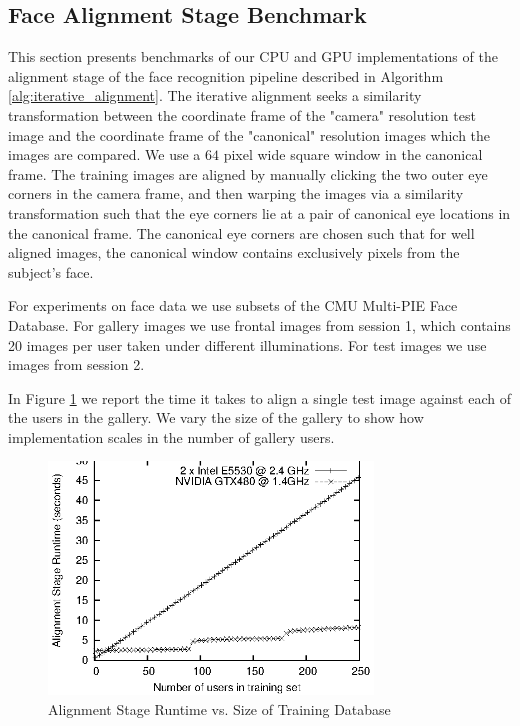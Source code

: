 \documentclass[10pt,twocolumn,letterpaper]{article}
\begin{document}
\subsection{Face Alignment Stage Benchmark} \label{sec:alignment_benchmark}
This section presents benchmarks of our CPU and GPU implementations of the
alignment stage of the face recognition pipeline described in Algorithm
\ref{alg:iterative_alignment}.  The iterative alignment seeks a similarity
transformation between the coordinate frame of the "camera" resolution test
image and the coordinate frame of the "canonical" resolution images which the
images are compared.  We use a $64$ pixel wide square window in the canonical
frame.  The training images are aligned by manually clicking the two outer eye
corners in the camera frame, and then warping the images via a similarity
transformation such that the eye corners lie at a pair of canonical eye
locations in the canonical frame.  The canonical eye corners are chosen such
that for well aligned images, the canonical window contains exclusively pixels
from the subject's face. 

For experiments on face data we use subsets of the CMU Multi-PIE Face Database.
For gallery images we use frontal images from session 1, which contains 20
images per user taken under different illuminations. For test images we use
images from session 2.  

In Figure \ref{fig:alignment_stage_runtime} we report the time it takes
to align a single test image against each of the users in the gallery.
We vary the size of the gallery to show how implementation scales in the
number of gallery users.
\begin{figure}
\centering
\includegraphics[width=3.4in]{figures/alignment_runtime_graph}
\caption{Alignment Stage Runtime vs. Size of Training Database}
\label{fig:alignment_stage_runtime}
\end{figure}
\end{document}
